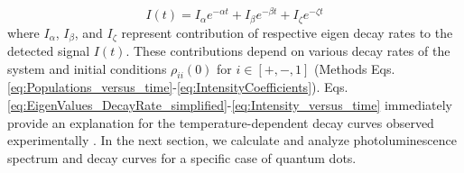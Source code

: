 \documentclass[aps,pra,preprint,groupedaddress]{revtex4-1}
\begin{document}
\begin{equation}
\label{eq:Intensity_versus_time}
I(t)= I_{\alpha}e^{-\alpha t} + I_{\beta}e^{-\beta t} + I_{\zeta}e^{-\zeta t}
\end{equation}
where $I_{\alpha}$, $I_{\beta}$, and $I_{\zeta}$ represent contribution of respective eigen decay rates to the detected signal $I(t)$. These contributions depend on various decay rates of the system and initial conditions $\rho_{ii}(0)$ for $i\in[+,-,1]$ (Methods Eqs. \ref{eq:Populations_versus_time}-\ref{eq:IntensityCoefficients}). Eqs. \ref{eq:EigenValues_DecayRate_simplified}-\ref{eq:Intensity_versus_time} immediately provide an explanation for the temperature-dependent decay curves observed experimentally \cite{Crooker2003, Biadala2009,Brovelli2011, Raino2011,Labeau2003, DeMelloDonega2006,Oron2009,Werschler2016}. In the next section, we calculate and analyze photoluminescence spectrum and decay curves for a specific case of quantum dots.

\end{document}
